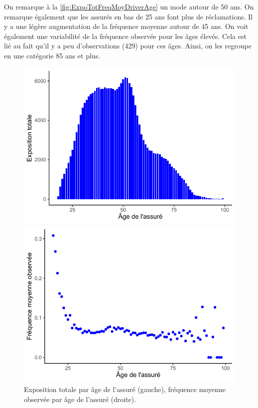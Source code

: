 On remarque à la \autoref{fig:ExpoTotFreqMoyDriverAge} un mode autour de 50 ans. On remarque également que les assurés en bas de 25 ans font plus de réclamations. Il y a une légère augmentation de la fréquence moyenne autour de 45 ans. On voit également une variabilité de la fréquence observée pour les âges élevés. Cela est lié au fait qu'il y a peu d'observations (429) pour ces âges. Ainsi, on les regroupe en une catégorie 85 ans et plus.

\begin{figure}
\caption{\label{fig:ExpoTotFreqMoyDriverAge} Exposition totale par âge de l'assuré (gauche), fréquence moyenne observée par âge de l'assuré (droite).}
\begin{minipage}{0.4\linewidth}
\includegraphics[scale=0.5]{Graphiques/ExpoTotDriverAge}
\end{minipage}
\hfill
\begin{minipage}{0.4\linewidth}
\includegraphics[scale=0.5]{Graphiques/FreqMoyDriverAge}
\end{minipage}
\end{figure}


